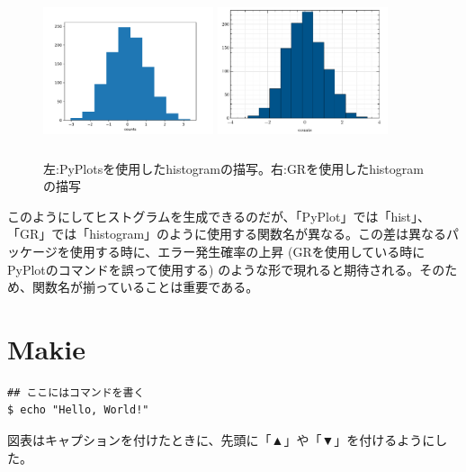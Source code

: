 \documentclass[11pt,dvipdfmx,b5paper,oneside]{jsbook}
\begin{document}
\begin{figure}
 \begin{minipage}[b]{0.45\linewidth}
   \centering
   \includegraphics[keepaspectratio, width=5cm, height=5cm]{hist_pyplot.pdf}
 \end{minipage}
 \begin{minipage}[b]{0.45\linewidth}
   \centering
   \includegraphics[keepaspectratio, width=5cm, height=5cm]{hist_gr.pdf}
 \end{minipage}
 \caption{左:PyPlotsを使用したhistogramの描写。右:GRを使用したhistogramの描写}
\end{figure}
このようにしてヒストグラムを生成できるのだが、「PyPlot」では「hist」、「GR」では「histogram」のように使用する関数名が異なる。この差は異なるパッケージを使用する時に、エラー発生確率の上昇 (GRを使用している時にPyPlotのコマンドを誤って使用する) のような形で現れると期待される。そのため、関数名が揃っていることは重要である。

\section{Makie}
\begin{shaded}
\begin{verbatim}
## ここにはコマンドを書く
$ echo "Hello, World!"
\end{verbatim}
\end{shaded}

図表はキャプションを付けたときに、先頭に「▲」や「▼」を付けるようにした。
\end{document}
